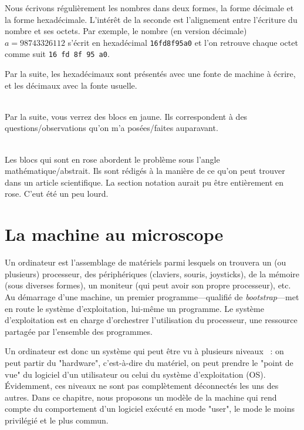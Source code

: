 \documentclass{book}
\newenvironment{commentaire}[1]{%
	\def\FrameCommand{\fboxrule=\FrameRule\fboxsep=\FrameSep \fcolorbox{yellow!50}{yellow!10}}%
	\MakeFramed {\advance\hsize-\width \FrameRestore}
	\noindent {\bf #1}\\
}%
{\endMakeFramed}
\newenvironment{formalisme}[1]{%
	\def\FrameCommand{\fboxrule=\FrameRule\fboxsep=\FrameSep \fcolorbox{red!10}{red!5}}%
	\MakeFramed {\advance\hsize-\width \FrameRestore}
	\noindent {\bf #1}\\
}%
{\endMakeFramed}
\newcommand{\hexa}[1]{{\tt #1}}
\begin{document}
Nous écrivons régulièrement les nombres dans deux formes, la forme décimale et la forme hexadécimale. L'intérêt de la seconde est l'alignement entre l'écriture du nombre et ses octets. Par exemple, le nombre (en version décimale) $a = 98743326112$ s'écrit en hexadécimal   \hexa{16fd8f95a0} et l'on retrouve chaque octet comme suit \hexa{16 fd 8f 95 a0}. 
 
 Par la suite, les hexadécimaux sont présentés avec une fonte de machine à écrire, et les décimaux avec la fonte usuelle. 
 

\begin{commentaire}{Questions/observations}
	Par la suite, vous verrez des blocs en jaune. Ils correspondent à des questions/observations qu'on m'a posées/faites auparavant. 
\end{commentaire}

\begin{formalisme}{Formalisme}
	Les blocs qui sont en rose abordent le problème sous l'angle mathématique/abstrait. Ils sont rédigés à la manière de ce qu'on peut trouver dans un article scientifique. La section notation aurait pu être entièrement en rose. C'eut été un peu lourd.
\end{formalisme}


\chapter{La machine au microscope}

Un ordinateur est l'assemblage de matériels parmi lesquels on trouvera un (ou plusieurs) processeur, des périphériques (claviers, souris, joysticks), de la mémoire (sous diverses formes), un moniteur (qui peut avoir son propre processeur), etc. Au démarrage d'une machine, un premier programme---qualifié de \emph{bootstrap}---met en route le système d'exploitation, lui-même un programme. Le système d'exploitation est en charge d'orchestrer l'utilisation du processeur, une ressource partagée par l'ensemble des programmes. 

Un ordinateur est donc un système qui peut être vu à plusieurs niveaux~ : on peut partir du "hardware", c'est-à-dire du matériel, on peut prendre le "point de vue" du logiciel d'un utilisateur ou celui du système d'exploitation (OS). \'Evidemment, ces niveaux ne sont pas complètement déconnectés les uns des autres. Dans ce chapitre, nous proposons un modèle de la machine qui rend compte du comportement d'un logiciel exécuté en mode "user", le mode le moins privilégié et le plus commun.
\end{document}
